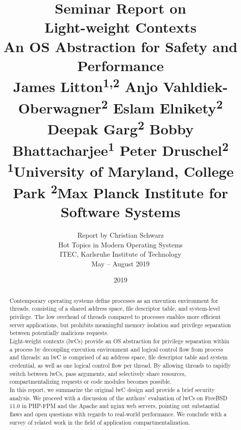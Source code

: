\documentclass[10pt,twocolumn,a4paper]{article}
\begin{document}
\title{%
  {\normalfont \normalsize Seminar Report on}\\%
  Light-weight Contexts\\%
  {\normalfont \normalsize An OS Abstraction for Safety and Performance}\\%
  {\normalfont \small %
    James Litton\textsuperscript{1,2}
    Anjo Vahldiek-Oberwagner\textsuperscript{2}
    Eslam Elnikety\textsuperscript{2}
    Deepak Garg\textsuperscript{2}
    Bobby Bhattacharjee\textsuperscript{1}
    Peter Druschel\textsuperscript{2}
  }\\
  {\normalfont \small
    \textsuperscript{1}University of Maryland, College Park 
    \textsuperscript{2}Max Planck Institute for Software Systems
  }%
}
\author{%
Report by Christian Schwarz\\%
{\small Hot Topics in Modern Operating Systems}\\%
{\small ITEC, Karlsruhe Institute of Technology}\\%
{\small May -- August 2019}\\%
\vspace{1em}
}
\date{2019}

\maketitle

\begin{abstract}
Contemporary operating systems define processes as an execution environment for threads, consisting of a shared address space, file descriptor table, and system-level privilege.
The low overhead of threads compared to processes enables more efficient server applications, but prohibits meaningful memory isolation and privilege separation between potentially malicious requests.\\
Light-weight contexts (lwCs) provide an OS abstraction for privilege separation within a process by decoupling execution environment and logical control flow from process and threads:
an lwC is comprised of an address space, file descriptor table and system credential, as well as one logical control flow per thread.
By allowing threads to rapidly switch between lwCs, pass arguments, and selectively share resources, compartmentalizing requests or code modules becomes possible.\\
In this report, we summarize the original lwC design and provide a brief security analysis.
We proceed with a discussion of the authors' evaluation of lwCs on FreeBSD 11.0 in PHP-FPM and the Apache and nginx web servers, pointing out substantial flaws and open questions with regards to real-world performance.
We conclude with a survey of related work in the field of application compartmentalization.
\end{abstract}
\end{document}
